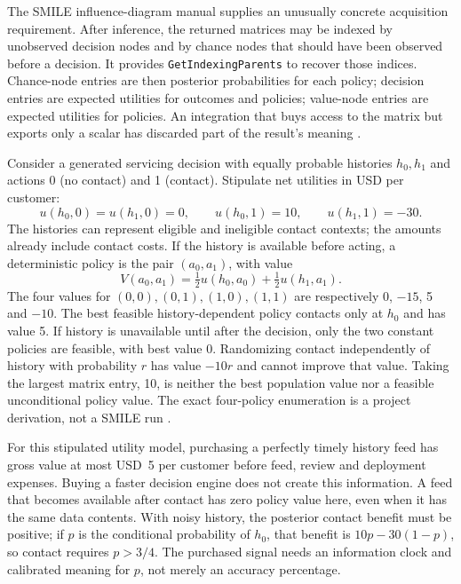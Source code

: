 The SMILE influence-diagram manual supplies an unusually concrete acquisition
requirement. After inference, the returned matrices may be indexed by
unobserved decision nodes and by chance nodes that should have been observed
before a decision. It provides \texttt{GetIndexingParents} to recover those
indices. Chance-node entries are then posterior probabilities for each policy;
decision entries are expected utilities for outcomes and policies; value-node
entries are expected utilities for policies. An integration that buys access
to the matrix but exports only a scalar has discarded part of the result's
meaning \citep{exec16_cp_bayesfusion}.

Consider a generated servicing decision with equally probable histories
$h_0,h_1$ and actions 0 (no contact) and 1 (contact). Stipulate net utilities
in USD per customer:
\begin{equation}
 u(h_0,0)=u(h_1,0)=0,\qquad u(h_0,1)=10,\qquad u(h_1,1)=-30.
 \label{exec17:s8-utility-table}
\end{equation}
The histories can represent eligible and ineligible contact contexts; the
amounts already include contact costs. If the history is available before
acting, a deterministic policy is the pair $(a_0,a_1)$, with value
\begin{equation}
 V(a_0,a_1)=\tfrac12u(h_0,a_0)+\tfrac12u(h_1,a_1).
 \label{exec17:s8-indexed-value}
\end{equation}
The four values for $(0,0),(0,1),(1,0),(1,1)$ are respectively 0, $-15$,
5 and $-10$. The best feasible history-dependent policy contacts only at
$h_0$ and has value 5. If history is unavailable until after the decision,
only the two constant policies are feasible, with best value 0. Randomizing
contact independently of history with probability $r$ has value $-10r$ and
cannot improve that value. Taking the largest matrix entry, 10, is neither
the best population value nor a feasible unconditional policy value. The
exact four-policy enumeration is a project derivation, not a SMILE run
\citep{exec17_s8_examples}.

For this stipulated utility model, purchasing a perfectly timely history
feed has gross value at most USD~5 per customer before feed, review and
deployment expenses. Buying a faster decision engine does not create this
information. A feed that becomes available after contact has zero policy
value here, even when it has the same data contents. With noisy history,
the posterior contact benefit must be positive; if $p$ is the conditional
probability of $h_0$, that benefit is $10p-30(1-p)$, so contact requires
$p>3/4$. The purchased signal needs an information clock and calibrated
meaning for $p$, not merely an accuracy percentage.

